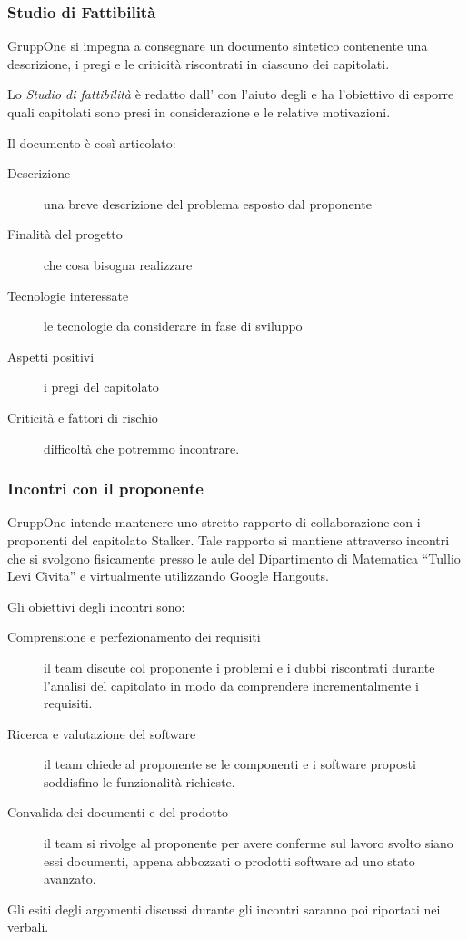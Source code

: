 \documentclass[../norme-di-progetto.tex]{subfiles}
\begin{document}
\subsubsection{Studio di Fattibilità}%
\label{subs:studio_di_fattibilita}

GruppOne si impegna a consegnare un documento sintetico contenente una descrizione, i pregi e le criticità riscontrati in ciascuno dei capitolati.

Lo \textit{Studio di fattibilità} è redatto dall' con l'aiuto degli  e ha l'obiettivo di esporre quali capitolati sono presi in considerazione e le relative motivazioni.

Il documento è così articolato:
\begin{description}
  \item [Descrizione] una breve descrizione del problema esposto dal proponente
  \item [Finalità del progetto] che cosa bisogna realizzare
  \item [Tecnologie interessate] le tecnologie da considerare in fase di sviluppo
  \item [Aspetti positivi] i pregi del capitolato
  \item [Criticità e fattori di rischio] difficoltà che potremmo incontrare.
\end{description}

\subsubsection{Incontri con il proponente}%
\label{subs:incontri_con_il_proponente}

GruppOne intende mantenere uno stretto rapporto di collaborazione con i proponenti del capitolato Stalker.
Tale rapporto si mantiene attraverso incontri che si svolgono fisicamente presso le aule del Dipartimento di Matematica ``Tullio Levi Civita'' e virtualmente utilizzando Google Hangouts.

Gli obiettivi degli incontri sono:
\begin{description}
  \item [Comprensione e perfezionamento dei requisiti] il team discute col proponente i problemi e i dubbi riscontrati durante l'analisi del capitolato in modo da comprendere incrementalmente i requisiti.
  \item [Ricerca e valutazione del software] il team chiede al proponente se le componenti e i software proposti soddisfino le funzionalità richieste.
  \item [Convalida dei documenti e del prodotto] il team si rivolge al proponente per avere conferme sul lavoro svolto siano essi documenti,  appena abbozzati o prodotti software ad uno stato avanzato.
\end{description}
Gli esiti degli argomenti discussi durante gli incontri saranno poi riportati nei verbali.
\end{document}
